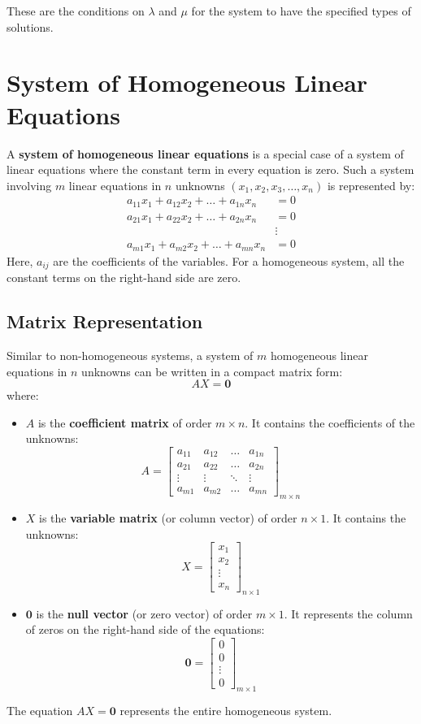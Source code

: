 \documentclass{article}
\begin{document}
These are the conditions on $\lambda$ and $\mu$ for the system to have the specified types of solutions.

\section{System of Homogeneous Linear Equations} %

A \textbf{system of homogeneous linear equations} is a special case of a system of linear equations where the constant term in every equation is zero. Such a system involving $m$ linear equations in $n$ unknowns $(x_1, x_2, x_3, \dots, x_n)$ is represented by:
\begin{align*} a_{11} x_1 + a_{12} x_2 + \dots + a_{1n} x_n &= 0 \\ a_{21} x_1 + a_{22} x_2 + \dots + a_{2n} x_n &= 0 \\ &\vdots \\ a_{m1} x_1 + a_{m2} x_2 + \dots + a_{mn} x_n &= 0 \end{align*}
Here, $a_{ij}$ are the coefficients of the variables. For a homogeneous system, all the constant terms on the right-hand side are zero.

\subsection{Matrix Representation}

Similar to non-homogeneous systems, a system of $m$ homogeneous linear equations in $n$ unknowns can be written in a compact matrix form:
\[ AX = \mathbf{0} \]
where:
\begin{itemize}
    \item $A$ is the \textbf{coefficient matrix} of order $m \times n$. It contains the coefficients of the unknowns:
    \[ A = \begin{bmatrix} a_{11} & a_{12} & \dots & a_{1n} \\ a_{21} & a_{22} & \dots & a_{2n} \\ \vdots & \vdots & \ddots & \vdots \\ a_{m1} & a_{m2} & \dots & a_{mn} \end{bmatrix}_{m \times n} \]
    \item $X$ is the \textbf{variable matrix} (or column vector) of order $n \times 1$. It contains the unknowns:
    \[ X = \begin{bmatrix} x_1 \\ x_2 \\ \vdots \\ x_n \end{bmatrix}_{n \times 1} \]
    \item $\mathbf{0}$ is the \textbf{null vector} (or zero vector) of order $m \times 1$. It represents the column of zeros on the right-hand side of the equations:
    \[ \mathbf{0} = \begin{bmatrix} 0 \\ 0 \\ \vdots \\ 0 \end{bmatrix}_{m \times 1} \]
\end{itemize}
The equation $AX = \mathbf{0}$ represents the entire homogeneous system.
\end{document}

